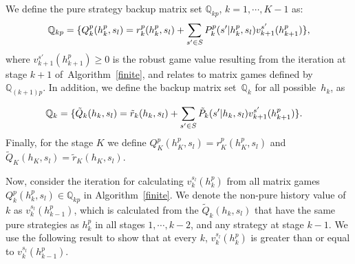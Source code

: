 \iffalse
Now, consider the iteration for calculating the pure history value $v_{k}^{s_{l}}(h^{p}_{k})$ (from extreme points $(r_{kp},\mathbb{P}_{kp})$). %
We denote the non-pure history value of $k$ as $v_{k}^{s_{l}}(h^{p}_{k-1})$, which is calculated from the $(r_k,\mathbb{P}_k)$ that have pure strategies in all stages $1,\cdots,k-2$, and any strategy at stage $k-1$.
\fi



We define the pure strategy backup matrix set $\mathbb{Q}_{kp}$, $k=1,\cdots,K-1$ as:
\vspace{-5pt}
\footnotesize
\begin{align}
\vspace{-5pt}
\mathbb{Q}_{kp}=\{Q_{k}^{p}(h^{p}_{k},s_{l}) = r^{p}_{k}(h^{p}_{k},s_{l})+\sum_{s'\in S} P^{p}_{k}( s' |h^{p}_{k},s_{l})v_{k+1}^{s'}(h^{p}_{k+1})\},
\label{eq:Q}
\end{align}
\normalsize
where $v^{s'}_{k+1}(h^p_{k+1})\geq 0$ is the robust game value resulting from the iteration at stage $k+1$ of~Algorithm~\ref{finite}, and relates to matrix games defined by $\mathbb{Q}_{(k+1)p}$.
 In addition,  we define the backup matrix set~$\mathbb{Q}_{k}$ for all possible~$h_{k}$,  as
 
\vspace{-8pt}
\footnotesize
\begin{align*}
\vspace{-5pt}
\mathbb{Q}_{k}= 
\{&\tilde{Q}_{k}(h_{k},s_{l})=\tilde{r}_{k}(h_{k},s_{l})+\sum_{s'\in S}\tilde{P}_{k}(s'|h_{k},s_{l})v^{s'}_{k+1}(h^p_{k+1})\}.
\end{align*} 
\normalsize
Finally, for the stage $K$ we define $Q_{K}^{p}(h^{p}_{K},s_{l})= r^{p}_{K}(h^{p}_{K},s_{l})$ and $\tilde{Q}_{K}(h_{K},s_{l})=\tilde{r}_{K}(h_{K},s_{l})$. 

Now, consider the iteration for calculating $v_{k}^{s_{l}}(h^{p}_{k})$ from all matrix games $Q_{k}^{p}(h^{p}_{k},s_{l})\in \mathbb{Q}_{kp}$ in Algorithm~\ref{finite}. 
We denote the non-pure history value of $k$ as $v_{k}^{s_{l}}(h^{p}_{k-1})$, which is calculated from the $\tilde{Q}_{k}(h_{k},s_{l})$ that have the same pure strategies as $h^p_k$ in all stages $1,\cdots,k-2$, and any strategy at stage $k-1$.
We use the following result to show that  at every $k$, $v_{k}^{s_{l}}(h^{p}_{k})$ is greater than or equal to $v_{k}^{s_{l}}(h^{p}_{k-1})$.


